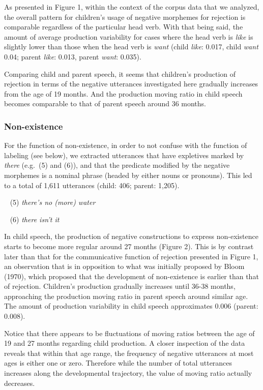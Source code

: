 \documentclass[10pt, letterpaper]{article}
\begin{document}
As presented in Figure 1, within the context of the corpus data that we
analyzed, the overall pattern for children's usage of negative morphemes
for rejection is comparable regardless of the particular head verb. With
that being said, the amount of average production variability for cases
where the head verb is \emph{like} is slightly lower than those when the
head verb is \emph{want} (child \emph{like}: 0.017, child \emph{want}
0.04; parent \emph{like}: 0.013, parent \emph{want}: 0.035).

Comparing child and parent speech, it seems that children's production
of rejection in terms of the negative utterances investigated here
gradually increases from the age of 19 months. And the production moving
ratio in child speech becomes comparable to that of parent speech around
36 months.

\hypertarget{non-existence}{%
\subsubsection{Non-existence}\label{non-existence}}

For the function of non-existence, in order to not confuse with the
function of labeling (see below), we extracted utterances that have
expletives marked by \emph{there} (e.g.~(5) and (6)), and that the
predicate modified by the negative morphemes is a nominal phrase (headed
by either nouns or pronouns). This led to a total of 1,611 utterances
(child: 406; parent: 1,205).

~ (5) \emph{there's no (more) water}

~ (6) \emph{there isn't it}

In child speech, the production of negative constructions to express
non-existence starts to become more regular around 27 months (Figure 2).
This is by contrast later than that for the communicative function of
rejection presented in Figure 1, an observation that is in opposition to
what was initially proposed by Bloom (1970), which proposed that the
development of non-existence is earlier than that of rejection.
Children's production gradually increases until 36-38 months,
approaching the production moving ratio in parent speech around similar
age. The amount of production variability in child speech approximates
0.006 (parent: 0.008).

Notice that there appears to be fluctuations of moving ratios between
the age of 19 and 27 months regarding child production. A closer
inspection of the data reveals that within that age range, the frequency
of negative utterances at most ages is either one or zero. Therefore
while the number of total utterances increases along the developmental
trajectory, the value of moving ratio actually decreases.
\end{document}
